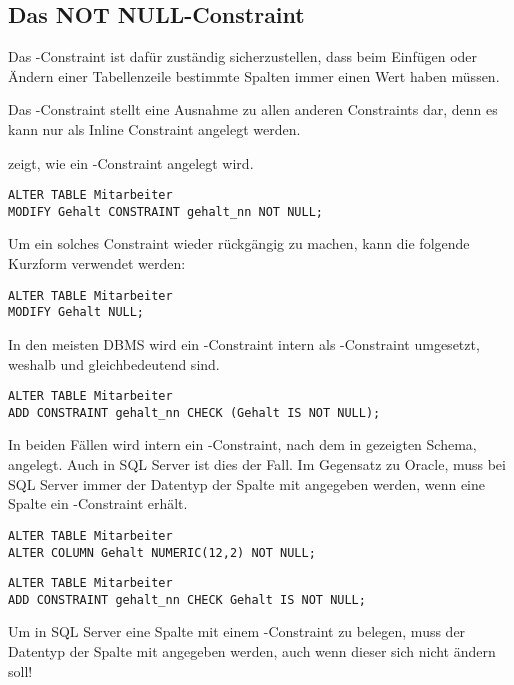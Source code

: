       \subsection{Das NOT NULL-Constraint}
        Das \NOTNULL-Constraint ist dafür zuständig sicherzustellen, dass beim Einfügen oder Ändern einer Tabellenzeile bestimmte Spalten immer einen Wert haben müssen.

        \begin{merke}
          Das \NOTNULL-Constraint stellt eine Ausnahme zu allen anderen Constraints dar, denn es kann nur als Inline Constraint angelegt werden.
        \end{merke}
         zeigt, wie ein \NOTNULL-Constraint angelegt wird.
        \begin{lstlisting}[language=oracle_sql,caption={Ein \NOTNULL-Constraint anlegen in Oracle},label=sql09_05]
ALTER TABLE Mitarbeiter
MODIFY Gehalt CONSTRAINT gehalt_nn NOT NULL;
        \end{lstlisting}
        Um ein solches Constraint wieder rückgängig zu machen, kann die folgende Kurzform verwendet werden:
        \begin{lstlisting}[language=oracle_sql,caption={Das Gegenteil von \NOTNULL},label=sql09_06]
ALTER TABLE Mitarbeiter
MODIFY Gehalt NULL;
        \end{lstlisting}
        In den meisten DBMS wird ein \NOTNULL-Constraint intern als
\CHECK-Constraint umgesetzt, weshalb  und
 gleichbedeutend sind.
        \begin{lstlisting}[language=oracle_sql,caption={Die alternative Form eines \NOTNULL-Constraints in Oracle},label=sql09_07]
ALTER TABLE Mitarbeiter
ADD CONSTRAINT gehalt_nn CHECK (Gehalt IS NOT NULL);
        \end{lstlisting}
        In beiden Fällen wird intern ein \CHECK-Constraint, nach dem in  gezeigten Schema, angelegt. Auch in SQL Server ist dies der Fall. Im Gegensatz zu Oracle, muss bei SQL Server immer der Datentyp der Spalte mit angegeben werden, wenn eine Spalte ein \NOTNULL-Constraint erhält.
        \begin{lstlisting}[language=ms_sql,caption={Ein \NOTNULL{} Constraint
anlegen in SQL Server},label=sql09_08]
ALTER TABLE Mitarbeiter
ALTER COLUMN Gehalt NUMERIC(12,2) NOT NULL;
        \end{lstlisting}
        \begin{lstlisting}[language=ms_sql,caption={Die alternative Form eines
\NOTNULL{} Constraints in SQL Server},label=sql09_09]
ALTER TABLE Mitarbeiter
ADD CONSTRAINT gehalt_nn CHECK Gehalt IS NOT NULL;
        \end{lstlisting}
        \begin{merke}
          Um in SQL Server eine Spalte mit einem \NOTNULL-Constraint zu belegen, muss der Datentyp der Spalte mit angegeben werden, auch wenn dieser sich nicht ändern soll!
        \end{merke}
